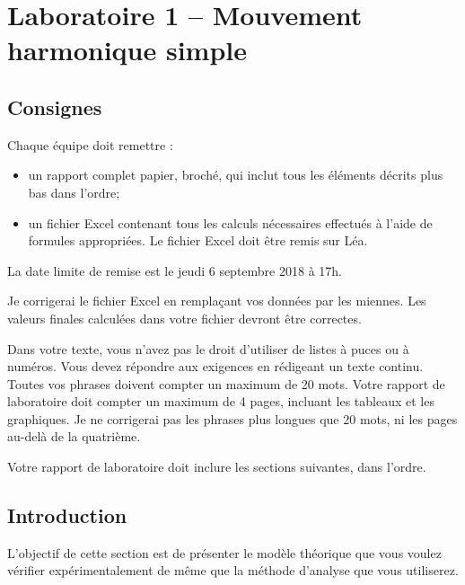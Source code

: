 \documentclass[]{article}
\date{}
\providecommand{\tightlist}{%
  \setlength{\itemsep}{0pt}\setlength{\parskip}{0pt}}
\begin{document}
\hypertarget{laboratoire-1-mouvement-harmonique-simple}{%
\section*{Laboratoire 1 -- Mouvement harmonique
simple}\label{laboratoire-1-mouvement-harmonique-simple}}


\hypertarget{consignes}{%
\subsection*{Consignes}\label{consignes}}

Chaque équipe doit remettre :

\begin{itemize}
\tightlist
\item
  un rapport complet papier, broché, qui inclut tous les éléments
  décrits plus bas dans l'ordre;
\item
  un fichier Excel contenant tous les calculs nécessaires effectués à
  l'aide de formules appropriées. Le fichier Excel doit être remis sur
  Léa.
\end{itemize}

La date limite de remise est le jeudi 6 septembre 2018 à 17h.

Je corrigerai le fichier Excel en remplaçant vos données par les
miennes. Les valeurs finales calculées dans votre fichier devront être
correctes.

Dans votre texte, vous n'avez pas le droit d'utiliser de listes à puces
ou à numéros. Vous devez répondre aux exigences en rédigeant un texte
continu. Toutes vos phrases doivent compter un maximum de 20 mots. Votre
rapport de laboratoire doit compter un maximum de 4 pages, incluant les
tableaux et les graphiques. Je ne corrigerai pas les phrases plus
longues que 20 mots, ni les pages au-delà de la quatrième.

Votre rapport de laboratoire doit inclure les sections suivantes, dans
l'ordre.

\hypertarget{introduction}{%
\subsection*{Introduction}\label{introduction}}

L'objectif de cette section est de présenter le modèle théorique que
vous voulez vérifier expérimentalement de même que la méthode d'analyse
que vous utiliserez.
\end{document}
